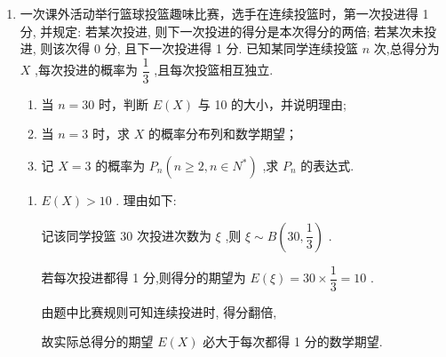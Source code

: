 \begin{enumerate}
\begin{enumerate}
\begin{jieda}
\begin{enumerate}
                \item 设 $A{ = }^{\prime \prime }$ 在抽取的 20 件产品中，随机抽取 3 件，既有一等品又有二等品”，$P\left( B\right)  = \dfrac{{10} \times  6 \times  4 + {{C}}_{10}^{2} \times  6 + {10} \times  {{C}}_{6}^{2}}{{{C}}_{20}^{3}} = \dfrac{11}{19}$
                
                \item ${p}_{1} < {p}_{2}$ ,因为 ${p}_{1} = {{C}}_{10}^{5}{\left( \dfrac{3}{5}\right) }^{5}{\left( \dfrac{2}{5}\right) }^{5},{p}_{2} = {{C}}_{10}^{7}{\left( \dfrac{3}{5}\right) }^{7}{\left( \dfrac{2}{5}\right) }^{3}$，所以 $\dfrac{{p}_{1}}{{p}_{2}} = \dfrac{42}{45} < 1$ .
            \end{enumerate}
        \end{jieda}
        
        \item 一次课外活动举行篮球投篮趣味比赛，选手在连续投篮时，第一次投进得 1 分, 并规定: 若某次投进, 则下一次投进的得分是本次得分的两倍; 若某次未投进, 则该次得 0 分, 且下一次投进得 1 分. 已知某同学连续投篮 $n$ 次,总得分为 $X$ ,每次投进的概率为 $\dfrac{1}{3}$ ,且每次投篮相互独立.
        \begin{enumerate}
            \item 当 $n = {30}$ 时，判断 $E\left( X\right)$ 与 10 的大小，并说明理由;
            
            \item 当 $n = 3$ 时，求 $X$ 的概率分布列和数学期望；
            
            \item 记 $X = 3$ 的概率为 ${P}_{n}\left( {n \geq  2,n \in  {N}^{ * }}\right)$ ,求 ${P}_{n}$ 的表达式.
        \end{enumerate}
        \begin{jieda}
            \begin{enumerate}
                \item $E\left( X\right)  > {10}$ . 理由如下:
                
                记该同学投篮 30 次投进次数为 $\xi$ ,则 $\xi  \sim  B\left( {{30},\dfrac{1}{3}}\right)$ .
                
                若每次投进都得 1 分,则得分的期望为 $E\left( \xi \right)  = {30} \times  \dfrac{1}{3} = {10}$ .
                
                由题中比赛规则可知连续投进时, 得分翻倍,
                
                故实际总得分的期望 $E\left( X\right)$ 必大于每次都得 1 分的数学期望.
                

\end{enumerate}
\end{jieda}
\end{enumerate}
\end{enumerate}
